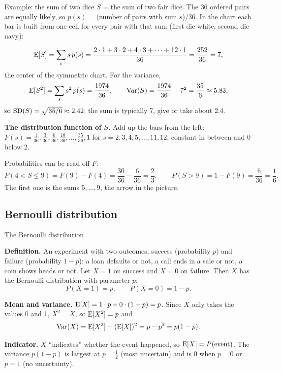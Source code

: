 \begin{key}{Example: the sum of two dice}
	\setlength{\parskip}{5pt}
	$S$ = the sum of two fair dice. The $36$ ordered pairs are equally likely,
	so $p(s)$ = (number of pairs with sum $s$)$/36$. In the chart each bar is
	built from one cell for every pair with that sum (first die white,
	second die navy):
	\begin{center}
		\dicebars
	\end{center}
	\[ \operatorname{E}[S]=\sum_s s\,p(s)=\frac{2\cdot1+3\cdot2+4\cdot3+\dots+12\cdot1}{36}
		=\frac{252}{36}=7, \]
	the center of the symmetric chart. For the variance,
	\[ \operatorname{E}[S^2]=\sum_s s^2\,p(s)=\frac{1974}{36},\qquad
		\operatorname{Var}(S)=\frac{1974}{36}-7^2=\frac{35}{6}\approx5.83, \]
	so $\operatorname{SD}(S)=\sqrt{35/6}\approx2.42$: the sum is typically 7, give or take
	about 2.4.

	\textbf{The distribution function of $S$.} Add up the bars from the left:
	$F(s)=\frac{1}{36},\frac{3}{36},\frac{6}{36},\frac{10}{36},\dots,
		\frac{35}{36},1$ for $s=2,3,4,5,\dots,11,12$, constant in between and 0
	below 2.
	\begin{center}
		\dicecdf
	\end{center}
	Probabilities can be read off $F$:
	\[ P(4<S\le9)=F(9)-F(4)=\frac{30}{36}-\frac{6}{36}=\frac{2}{3},\qquad
		P(S>9)=1-F(9)=\frac{6}{36}=\frac16. \]
	The first one is the sums $5,\dots,9$, the arrow in the picture.
\end{key}


\subsection*{Bernoulli distribution}

\begin{key}{The Bernoulli distribution}
	\setlength{\parskip}{5pt}
	\noindent\begin{minipage}[c]{.6\linewidth}
		\textbf{Definition.} An experiment with two outcomes, success
		(probability $p$) and failure (probability $1-p$): a loan defaults or
		not, a call ends in a sale or not, a coin shows heads or not. Let $X=1$
		on success and $X=0$ on failure. Then $X$ has the Bernoulli
		distribution with parameter $p$:
		\[ P(X=1)=p,\qquad P(X=0)=1-p. \]
	\end{minipage}\hfill
	\begin{minipage}[c]{.36\linewidth}
		\centering
		\figbernoulli
	\end{minipage}

	\textbf{Mean and variance.} $\operatorname{E}[X]=1\cdot p+0\cdot(1-p)=p$. Since $X$
	only takes the values 0 and 1, $X^2=X$, so $\operatorname{E}[X^2]=p$ and
	\[ \operatorname{Var}(X)=\operatorname{E}[X^2]-(\operatorname{E}[X])^2=p-p^2=p(1-p). \]

	\textbf{Indicator.} $X$ ``indicates'' whether the event happened, so
	$\operatorname{E}[X]=P(\text{event})$. The variance $p(1-p)$ is largest at $p=\frac12$
	(most uncertain) and is 0 when $p=0$ or $p=1$ (no uncertainty).
\end{key}

